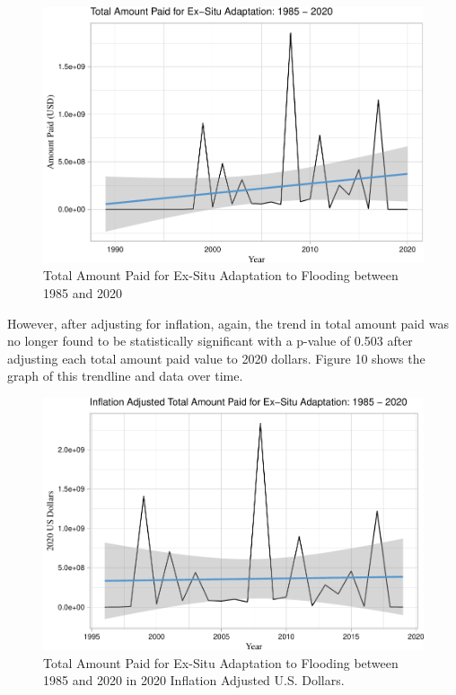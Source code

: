 \documentclass[
  12pt,
]{article}
\begin{document}
\begin{figure}
\centering
\includegraphics{finalreport_files/figure-latex/unnamed-chunk-16-1.pdf}
\caption{Total Amount Paid for Ex-Situ Adaptation to Flooding between
1985 and 2020}
\end{figure}

\newpage

However, after adjusting for inflation, again, the trend in total amount
paid was no longer found to be statistically significant with a p-value
of 0.503 after adjusting each total amount paid value to 2020 dollars.
Figure 10 shows the graph of this trendline and data over time.

\begin{figure}
\centering
\includegraphics{finalreport_files/figure-latex/unnamed-chunk-17-1.pdf}
\caption{Total Amount Paid for Ex-Situ Adaptation to Flooding between
1985 and 2020 in 2020 Inflation Adjusted U.S. Dollars.}
\end{figure}
\end{document}
